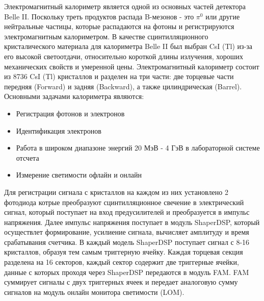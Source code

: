   Электромагнитный калориметр является одной из основных частей детектора Belle II. Поскольку треть продуктов распада B-мезонов - это $\pi^0$ или другие нейтральные частицы, которые распадаются на фотоны и регистрируются электромагнитным калориметром. В качестве сцинтилляционного кристалического материала для калориметра Belle II был выбран CsI (Tl) из-за его высокой светоотдачи, относительно короткой длины излучения, хороших механических свойств и умеренной цены. Электромагнитный калориметр состоит из 8736 CsI (Tl) кристаллов и разделен на три части: две торцевые части передняя (Forward) и задняя (Backward), а также цилиндрическая (Barrel). Основными задачами калориметра являются:
\begin{itemize}
  \item Регистрация фотонов и электронов
  \item Идентификация электронов
  \item Работа в широком диапазоне энергий 20 МэВ - 4 ГэВ в лабораторной системе отсчета
  \item Измерение светимости офлайн и онлайн
\end{itemize}\par
  Для регистрации сигнала с кристаллов на каждом из них установлено 2 фотодиода котрые преобразуют сцинтилляционное свечение в электрический сигнал, который поступает на вход предусилителей и преобразуется в импульс напряжения. Далее импульс напряжения поступает в модуль ShaperDSP, который осуществлет формирование, усилиение сигнала, вычисляет амплитуду и время срабатывания счетчика. В каждый модель ShaperDSP поступает сигнал с 8-16 кристаллов, образуя тем самым триггерную ячейку. Каждая торцевая секция разделена на 16 секторов, каждый сектор содержит две триггерные ячейки, данные с которых проходя через ShaperDSP передаются в модуль FAM. FAM суммирует сигналы с двух триггерных ячеек и передает аналоговую сумму сигналов на модуль онлайн монитора светимости (LOM).
